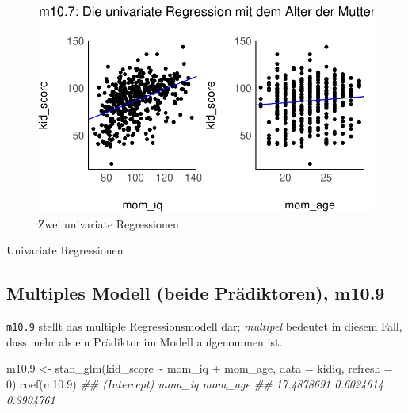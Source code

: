 \documentclass[
  a4paper,
  DIV=11]{scrreprt}
\newenvironment{Shaded}{\begin{snugshade}}{\end{snugshade}}
\newcommand{\AttributeTok}[1]{\textcolor[rgb]{0.40,0.45,0.13}{#1}}
\newcommand{\DecValTok}[1]{\textcolor[rgb]{0.68,0.00,0.00}{#1}}
\newcommand{\DocumentationTok}[1]{\textcolor[rgb]{0.37,0.37,0.37}{\textit{#1}}}
\newcommand{\FloatTok}[1]{\textcolor[rgb]{0.68,0.00,0.00}{#1}}
\newcommand{\FunctionTok}[1]{\textcolor[rgb]{0.28,0.35,0.67}{#1}}
\newcommand{\NormalTok}[1]{\textcolor[rgb]{0.00,0.23,0.31}{#1}}
\newcommand{\OtherTok}[1]{\textcolor[rgb]{0.00,0.23,0.31}{#1}}
\newcommand{\SpecialCharTok}[1]{\textcolor[rgb]{0.37,0.37,0.37}{#1}}
\theoremstyle{definition}
\theoremstyle{remark}
\begin{document}
\begin{figure}[H]

{\centering \includegraphics{./metrische-AV_files/figure-pdf/fig-regr-one-pred-1.pdf}

}

\caption{\label{fig-regr-one-pred}Zwei univariate Regressionen}

\end{figure}

Univariate Regressionen

\hypertarget{multiples-modell-beide-pruxe4diktoren-m10.9}{%
\subsection{Multiples Modell (beide Prädiktoren),
m10.9}\label{multiples-modell-beide-pruxe4diktoren-m10.9}}

\texttt{m10.9} stellt das multiple Regressionsmodell dar;
\emph{multipel} bedeutet in diesem Fall, dass mehr als ein Prädiktor im
Modell aufgenommen ist.

\begin{Shaded}
\begin{Highlighting}[]
\NormalTok{m10}\FloatTok{.9} \OtherTok{\textless{}{-}} \FunctionTok{stan\_glm}\NormalTok{(kid\_score }\SpecialCharTok{\textasciitilde{}}\NormalTok{ mom\_iq }\SpecialCharTok{+}\NormalTok{ mom\_age, }
                  \AttributeTok{data =}\NormalTok{ kidiq, }
                  \AttributeTok{refresh =} \DecValTok{0}\NormalTok{)}
\FunctionTok{coef}\NormalTok{(m10}\FloatTok{.9}\NormalTok{)}
\DocumentationTok{\#\# (Intercept)      mom\_iq     mom\_age }
\DocumentationTok{\#\#  17.4878691   0.6024614   0.3904761}
\end{Highlighting}
\end{Shaded}
\end{document}
